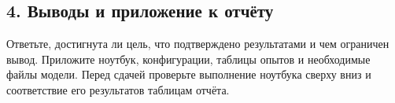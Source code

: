 \subsection*{4. Выводы и приложение к отчёту}
Ответьте, достигнута ли цель, что подтверждено результатами и чем ограничен вывод. Приложите ноутбук, конфигурации, таблицы опытов и необходимые файлы модели. Перед сдачей проверьте выполнение ноутбука сверху вниз и соответствие его результатов таблицам отчёта.

